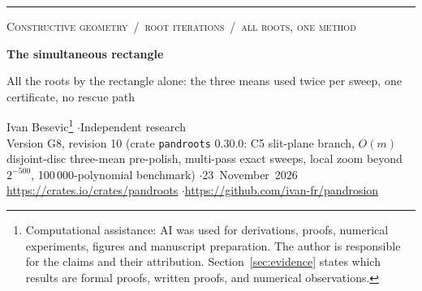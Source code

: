 \documentclass[10pt,a4paper]{article}
\theoremstyle{definition}
\numberwithin{equation}{section}
\begin{document}
\noindent\textcolor{supp}{\rule{\linewidth}{1.6pt}}
\vspace{4pt}

{\small\scshape\textcolor{slatec}{Constructive geometry \,/\, root iterations \,/\, all roots, one method}}

\vspace{5pt}
{\LARGE\bfseries\textcolor{ink}{The simultaneous rectangle}\par}
\vspace{3pt}
{\large\raggedright\textcolor{ink!85}{All the roots by the rectangle alone: the three means used twice per sweep, one certificate, no rescue path}\par}
\vspace{8pt}
Ivan Besevic\footnote{Computational assistance: AI was used for derivations, proofs, numerical experiments, figures and manuscript preparation. The author is responsible for the claims and their attribution. Section~\ref{sec:evidence} states which results are formal proofs, written proofs, and numerical observations.}
\quad$\cdot$\quad Independent research\\
Version G8, revision 10 (crate \texttt{pandroots} 0.30.0: C5 slit-plane branch, $O(m)$ disjoint-disc three-mean pre-polish, multi-pass exact sweeps, local zoom beyond $2^{-500}$, 100\,000-polynomial benchmark) \quad$\cdot$\quad \mbox{23 November 2026}\\
\url{https://crates.io/crates/pandroots} \quad$\cdot$\quad \url{https://github.com/ivan-fr/pandrosion}
\end{document}

